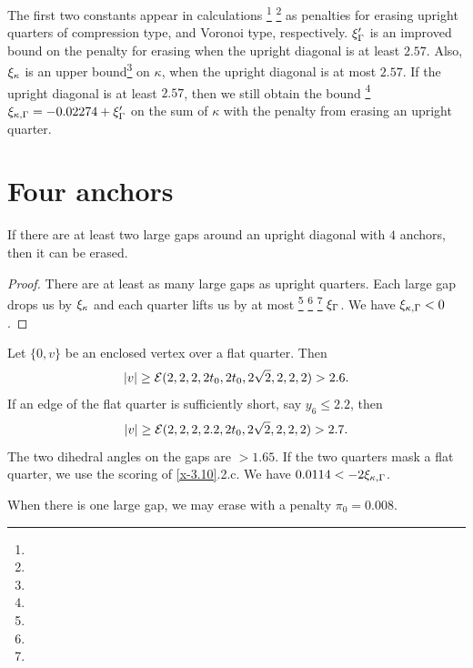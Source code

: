 The first two constants appear in calculations%
\footnote{} %
\footnote{} %
as penalties for erasing upright quarters of compression type, and
Voronoi type, respectively. $\xi_\Gamma'$ is an improved bound on the
penalty for erasing when the upright diagonal is at least $2.57$.
Also, $\xi_\kappa$ is an upper bound\footnote{} %
 on $\kappa$, when the
upright diagonal is at most $2.57$.  If the upright diagonal is at
least $2.57$, then we still obtain the bound%
\footnote{} %
$\xi_{\kappa,\Gamma} =-0.02274+\xi_\Gamma'$ on the sum of $\kappa$ with the
penalty from erasing an upright quarter.

\section{Four anchors}

\begin{lemma}
If there are at least two large gaps around an upright diagonal with $4$
anchors, then it can be erased.
\end{lemma}

\begin{proof}
There are at least as many large gaps as upright quarters. Each large
gap drops us by $\xi_\kappa$ and each quarter lifts us by at most%
\footnote{} %
\footnote{} %
\footnote{} %
$\xi_\Gamma$. We have $\xi_{\kappa,\Gamma}<0$.
\end{proof}

\begin{remark} \label{remark:2.6}
Let $\{0,v\}$ be an enclosed vertex over a flat quarter. Then
    $$|v|\ge{\mathcal E}(2,2,2,2t_0,2t_0,2\sqrt2,2,2,2)>2.6.$$
If an edge of the flat quarter is sufficiently short, say $y_6\le2.2$,
then
    $$|v|\ge{\mathcal E}(2,2,2,2.2,2t_0,2\sqrt2,2,2,2)>2.7.$$
The two dihedral angles on the gaps are $>1.65$.  If the two quarters
mask a flat quarter, we use the scoring of \ref{x-3.10}.2.c. We have
$0.0114< -2\xi_{\kappa,\Gamma}$.
\end{remark}


When there is one large gap, we may erase with a penalty $\pi_0=0.008$.

